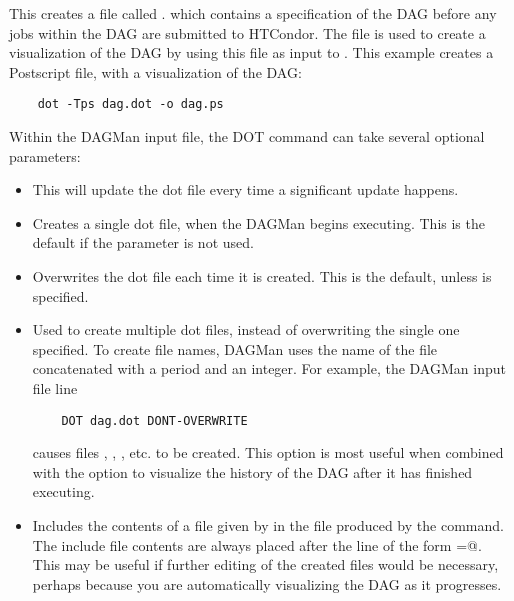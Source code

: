 This creates a file called .
which contains
a specification of the DAG before any jobs within the DAG
are submitted to HTCondor.
The  file is used to create a visualization
of the DAG by using this file as input to .
This example creates a Postscript file, with a visualization of the DAG:

\begin{verbatim}
    dot -Tps dag.dot -o dag.ps
\end{verbatim}

Within the DAGMan input file,
the DOT command can take several optional parameters:

\begin{itemize}

\item {}  This will update the dot file every time a
significant update happens. 

\item {} Creates a single dot file, when
the DAGMan begins executing. This is the default if the parameter
 is not used.

\item {} Overwrites the dot file each time it
is created. This is the default, unless 
is specified.

\item {} Used to create multiple dot files, instead
of overwriting the single one specified.
To create file names,
DAGMan uses the name of the file concatenated with a period and an
integer. For example, the DAGMan input file line
\begin{verbatim}
    DOT dag.dot DONT-OVERWRITE
\end{verbatim}
causes files
,
,
,
etc. to be created.
This option is
most useful when combined with the  option to
visualize the history of the DAG after it has finished executing. 

\item {} Includes the contents
of a file given by  in the file produced by the
 command.
The include file contents are always placed after the line of
the form
\verb@label=@.
This may be useful if further editing of the created files would
be necessary,
perhaps because you are automatically visualizing the DAG as it
progresses. 

\end{itemize}


